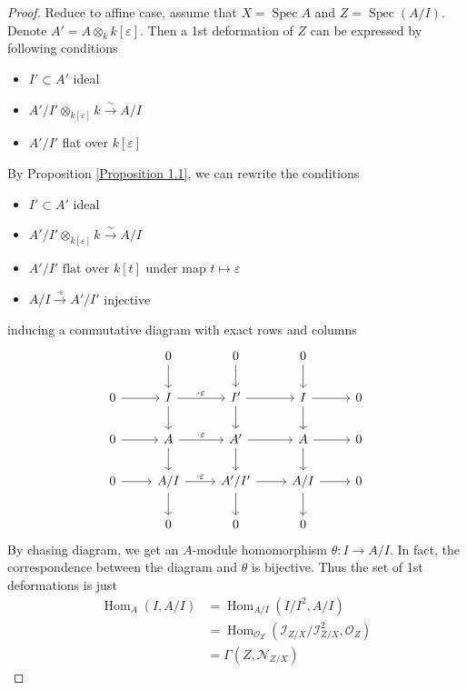 \documentclass{ctexart}
\renewcommand{\hom}{\operatorname{Hom}}
\newcommand{\spec}{\operatorname{Spec}}
\begin{document}
\begin{proof}
    Reduce to affine case, assume that $X = \spec A$ and $Z = \spec(A/I)$.
    Denote $A' = A \otimes_{k} k[\varepsilon]$.
    Then a 1st deformation of $Z$ can be expressed by following conditions
    \begin{itemize}
        \item $I' \subset A'$ ideal 
        \item $A'/I' \otimes_{k[\varepsilon]} k \overset{\sim}{\longrightarrow} A/I$
        \item $A'/I'$ flat over $k[\varepsilon]$
    \end{itemize}
    By Proposition \ref{Proposition 1.1}, we can rewrite the conditions
    \begin{itemize}
        \item $I' \subset A'$ ideal
        \item $A'/I' \otimes_{k[\varepsilon]} k \overset{\sim}{\longrightarrow} A/I$
        \item $A'/I' \text{ flat over } k[t]$ under map $t \longmapsto \varepsilon$
        \item $A/I \overset{\cdot \varepsilon}{\longrightarrow} A'/I'$ injective
    \end{itemize}
    inducing a commutative diagram with exact rows and columns
    \begin{equation}
        \begin{tikzcd}
            & 0 \arrow[d] &
            0 \arrow[d] &
            0 \arrow[d] & \\
            0 \arrow[r] &
            I \arrow[r, "\cdot \varepsilon"] \arrow[d] &
            I' \arrow[r] \arrow[d] &
            I \arrow[r] \arrow[d] &
            0 \\
            0 \arrow[r] &
            A \arrow[r, "\cdot \varepsilon"] \arrow[d] &
            A' \arrow[r] \arrow[d] &
            A \arrow[r] \arrow[d] &
            0 \\
            0 \arrow[r] &
            A/I \arrow[r, "\cdot \varepsilon"] \arrow[d] &
            A'/I'\arrow[r] \arrow[d] &
            A/I \arrow[r] \arrow[d] &
            0 \\
            & 0 &
            0 &
            0 &
        \end{tikzcd}
    \end{equation}
    By chasing diagram, we get an $A$-module homomorphism $\theta: I \longrightarrow A/I$.
    In fact, the correspondence between the diagram and $\theta$ is bijective.
    Thus the set of 1st deformations is just
    \begin{equation}
        \begin{split}
            \hom_{A}(I, A/I) & = \hom_{A/I}(I/I^{2}, A/I) \\
            & = \hom_{\mathcal{O}_{Z}}(\mathcal{I}_{Z/X}/\mathcal{I}_{Z/X}^{2}, \mathcal{O}_{Z}) \\
            & = \Gamma(Z, \mathcal{N}_{Z/X})
        \end{split}
    \end{equation}
\end{proof}
\end{document}
